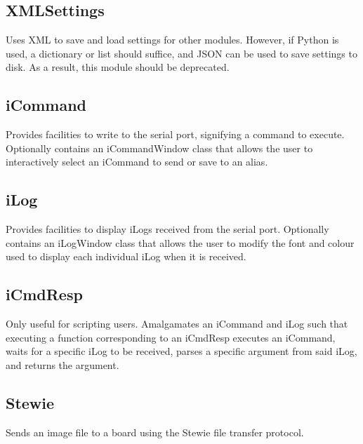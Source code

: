 \documentclass[12pt,letterpaper]{article}
\begin{document}
%
%
\subsection{XMLSettings}
\label{2.4}

Uses XML to save and load settings for other modules. However, if Python is used, a dictionary or list should suffice, and JSON can be used to save settings to disk. As a result, this module should be deprecated.



%
%
\subsection{iCommand}
\label{2.5}

Provides facilities to write to the serial port, signifying a command to execute. Optionally contains an iCommandWindow class that allows the user to interactively select an iCommand to send or save to an alias.



%
%
\subsection{iLog}
\label{2.6}

Provides facilities to display iLogs received from the serial port. Optionally contains an iLogWindow class that allows the user to modify the font and colour used to display each individual iLog when it is received.



%
%
\subsection{iCmdResp}
\label{2.7}

Only useful for scripting users. Amalgamates an iCommand and iLog such that executing a function corresponding to an iCmdResp executes an iCommand, waits for a specific iLog to be received, parses a specific argument from said iLog, and returns the argument.



%
%
\subsection{Stewie}
\label{2.8}

Sends an image file to a board using the Stewie file transfer protocol.
\end{document}
